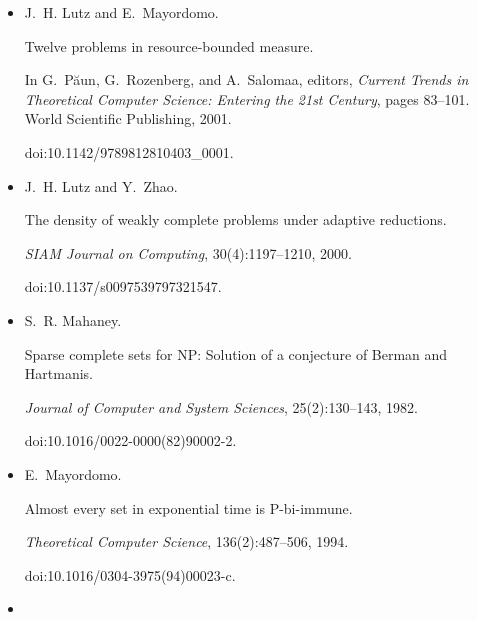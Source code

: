 \documentclass[10pt,a4paper]{article}
\begin{document}
\begin{itemize}
Measure, stochasticity, and the density of hard languages.


\emph{SIAM Journal on Computing}, 23(4):762–779, 1994.


doi:10.1137/s0097539792237498.





\item[] 
[56]

J. H. Lutz and E. Mayordomo.


Twelve problems in resource-bounded measure.


In G. Păun, G. Rozenberg, and A. Salomaa, editors, \emph{Current
Trends in Theoretical Computer Science: Entering the 21st Century}, pages
83–101. World Scientific Publishing, 2001.


doi:10.1142/9789812810403\_0001.





\item[] 
[57]

J. H. Lutz and Y. Zhao.


The density of weakly complete problems under adaptive reductions.


\emph{SIAM Journal on Computing}, 30(4):1197–1210, 2000.


doi:10.1137/s0097539797321547.





\item[] 
[58]

S. R. Mahaney.


Sparse complete sets for NP: Solution of a conjecture of Berman
and Hartmanis.


\emph{Journal of Computer and System Sciences}, 25(2):130–143, 1982.


doi:10.1016/0022-0000(82)90002-2.





\item[] 
[59]

E. Mayordomo.


Almost every set in exponential time is P-bi-immune.


\emph{Theoretical Computer Science}, 136(2):487–506, 1994.


doi:10.1016/0304-3975(94)00023-c.





\item[] 
[60]


\end{itemize}
\end{document}
